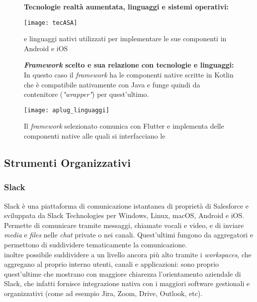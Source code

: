 \begin{figure}[H]
    \textbf{Tecnologie realtà aumentata, linguaggi e sistemi operativi:}
    \begin{center}
    \texttt{[image: tecASA]}
    \caption{\asa{} e linguaggi nativi utilizzati per implementare le sue componenti in Android e iOS}
    \end{center}
\end{figure}

\begin{figure}[H]
    \textbf{\textit{Framework} scelto e sua relazione con tecnologie e linguaggi:}\\
    In questo caso il \textit{framework} ha le componenti native scritte in Kotlin che è compatibile nativamente con Java e funge quindi da contenitore (\textit{"wrapper"}) per quest'ultimo.\\
    \begin{center}
    \texttt{[image: aplug\_linguaggi]}
    \caption{Il \textit{framework} selezionato comunica con Flutter e implementa delle componenti native alle quali si interfacciano le \asa{}}
    \end{center}
\end{figure}
\subsection{Strumenti Organizzativi}
\subsubsection{Slack}
Slack è una piattaforma di comunicazione istantanea di proprietà di Salesforce e sviluppata da Slack Technologies per Windows, Linux, macOS, Android e iOS.\\
Permette di comunicare tramite messaggi, chiamate vocali e video, e di inviare \textit{media} e \textit{files} nelle \textit{chat} private o nei canali. Quest'ultimi fungono da aggregatori e permettono di suddividere tematicamente la comunicazione.\\
\e{} inoltre possibile suddividere a un livello ancora più alto tramite i \textit{workspaces}, che aggregano al proprio interno utenti, canali e applicazioni: sono proprio quest'ultime che mostrano con maggiore chiarezza l'orientamento aziendale di Slack, che infatti fornisce integrazione nativa con i maggiori software gestionali e organizzativi (come ad esempio Jira, Zoom, Drive, Outlook, etc).

